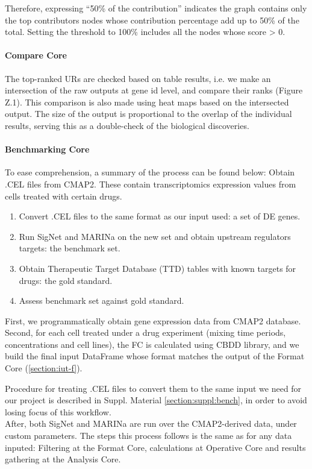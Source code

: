 Therefore, expressing “50\% of the contribution” indicates the graph contains only the top contributors nodes whose contribution percentage add up to 50\% of the total. Setting the threshold to 100\% includes all the nodes whose score > 0.

\paragraph{Compare Core}
The top-ranked URs are checked based on table results, i.e. we make an intersection of the raw outputs at gene id level, and compare their ranks (Figure Z.1). This comparison is also made using heat maps based on the intersected output.
The size of the output is proportional to the overlap of the individual results, serving this as a double-check of the biological discoveries.

\paragraph{Benchmarking Core}
To ease comprehension, a summary of the process can be found below:
Obtain .CEL files from CMAP2. These contain transcriptomics expression values from cells treated with certain drugs.
\begin{enumerate}
    \item Convert .CEL files to the same format as our input used: a set of DE genes.
    \item Run SigNet and MARINa on the new set and obtain upstream regulators targets: the benchmark set.
    \item Obtain Therapeutic Target Database (TTD) tables with known targets for drugs: the gold standard.
    \item Assess benchmark set against gold standard.
\end{enumerate}

First, we programmatically obtain gene expression data from CMAP2 database. Second, for each cell treated under a drug experiment (mixing time periods, concentrations and cell lines), the FC is calculated using CBDD library, and we build the final input DataFrame whose format matches the output of the Format Core (\ref{section:iut-f}).

Procedure for treating .CEL files to convert them to the same input we need for our project is described in Suppl. Material \ref{section:suppl:bench}, in order to avoid losing focus of this workflow.
\\

After, both SigNet and MARINa are run over the CMAP2-derived data, under custom parameters. The steps this process follows is the same as for any data inputed:
Filtering at the Format Core, calculations at Operative Core and results gathering at the Analysis Core.
\\

